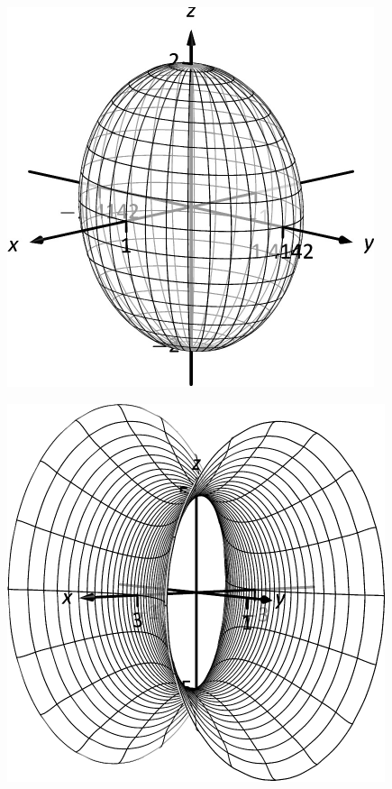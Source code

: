 \documentclass[10pt]{article}
\begin{document}
\includegraphics{fig10_01_ex_25_3DBW.pdf}
\texttt{}

\includegraphics{fig10_01_ex_26_3DBW.pdf}
\texttt{}
\end{document}
